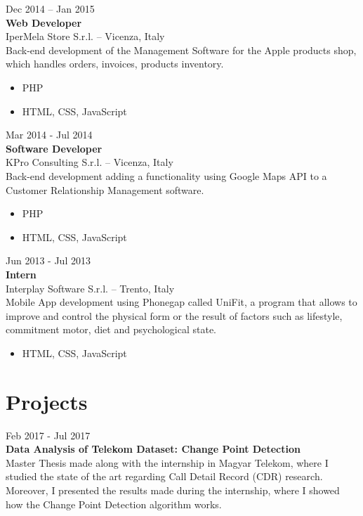 \documentclass[]{friggeri-cv}
\begin{document}
{Dec 2014 -- Jan 2015} \\
{\textbf{Web Developer}} \\
{IperMela Store S.r.l.} -- {Vicenza, Italy} \\
{Back-end development of the Management Software for the Apple products shop, which handles orders, invoices, products inventory.}
\begin{itemize}[noitemsep]
\item PHP
\item HTML, CSS, JavaScript \newline
\end{itemize}

{Mar 2014 - Jul 2014} \\
{\textbf{Software Developer}} \\
{KPro Consulting S.r.l.} -- {Vicenza, Italy} \\
{Back-end development adding a functionality using Google Maps API to a Customer Relationship Management software.}
\begin{itemize}[noitemsep]
\item PHP
\item HTML, CSS, JavaScript \newline
\end{itemize}

{Jun 2013 - Jul 2013} \\
{\textbf{Intern}} \\
{Interplay Software S.r.l.} -- {Trento, Italy} \\
{Mobile App development using Phonegap called UniFit, a program that allows to improve and control the physical form or the result of factors such as lifestyle, commitment motor, diet and psychological state.}\begin{itemize}[noitemsep]
\item HTML, CSS, JavaScript \newline
\end{itemize}



\section{Projects}

{Feb 2017 - Jul 2017} \\
{\textbf{Data Analysis of Telekom Dataset: Change Point Detection}} \\
Master Thesis made along with the internship in Magyar Telekom, where I studied the state of the art regarding Call Detail Record (CDR) research. Moreover,
I presented the results made during the internship, where I showed how the Change Point Detection algorithm works.
\end{document}
